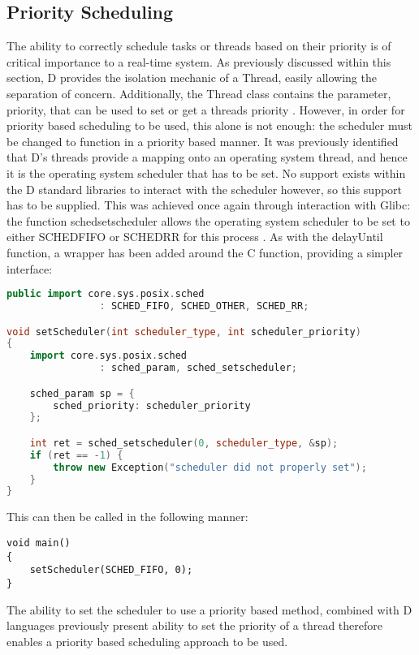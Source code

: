 \subsection{Priority Scheduling}
The ability to correctly schedule tasks or threads based on their priority is of 
critical importance to a real-time system. As previously discussed within this 
section, D provides the isolation mechanic of a Thread, easily allowing the 
separation of concern. Additionally, the Thread class contains the parameter, 
priority, that can be used to set or get a threads priority
\cite{http://dlang.org/phobos/core_thread.html}. 
However, in order for priority based scheduling to be used, this alone is not 
enough: the scheduler must be changed to function in a priority based manner. 
It was previously identified that D's threads provide a mapping onto an operating  
system thread, and hence it is the operating system scheduler that has to be set.  
No support exists within the D standard libraries to interact with the scheduler 
however, so this support has to be supplied. 
This was achieved once again through interaction with Glibc: the function 
sched\textunderscore{}setscheduler allows the operating system scheduler to 
be set to either SCHED\textunderscore{}FIFO or SCHED\textunderscore{}RR for 
this process
\cite{http://linux.die.net/man/2/sched_setscheduler}. 
As with the delayUntil function, a wrapper has been added around the C function,
providing a simpler interface: 
\begin{lstlisting}[language=C++]
public import core.sys.posix.sched 
                : SCHED_FIFO, SCHED_OTHER, SCHED_RR; 

void setScheduler(int scheduler_type, int scheduler_priority)
{
    import core.sys.posix.sched 
                : sched_param, sched_setscheduler; 

    sched_param sp = { 
        sched_priority: scheduler_priority 
    }; 

    int ret = sched_setscheduler(0, scheduler_type, &sp); 
    if (ret == -1) {
        throw new Exception("scheduler did not properly set");
    }
}
\end{lstlisting}
This can then be called in the following manner: 
\begin{lstlisting}
void main()
{
    setScheduler(SCHED_FIFO, 0); 
}
\end{lstlisting}
The ability to set the scheduler to use a priority based method, combined with 
D languages previously present ability to set the priority of a thread therefore 
enables a priority based scheduling approach to be used.  

